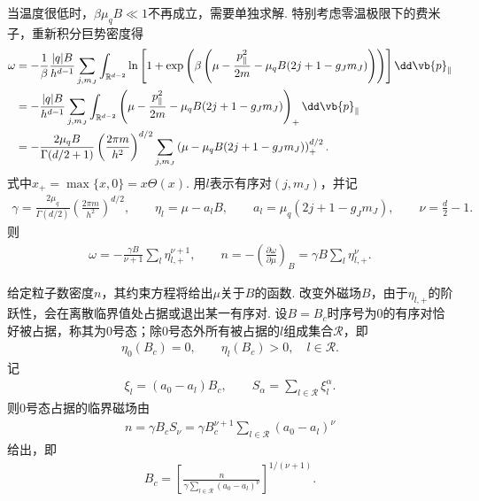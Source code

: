 当温度很低时，\(\beta\mu_{q}B\ll1\)不再成立，需要单独求解. 特别考虑零温极限下的费米子，重新积分巨势密度得
\begin{align*}
	\omega
	&=
	-\frac{1}{\beta}\frac{|q|B}{h^{d-1}}
	\sum_{j,m_{J}}
	\int_{\mathbb{R}^{d-2}}
	\ln\left[
		1+\exp\left(\beta\left(
		\mu-\frac{p_{\parallel}^{2}}{2m}
		-\mu_{q}B(2j+1-g_{J}m_{J})\right)
		\right)
		\right]\dd\vb{p}_{\parallel}\\
	&=
	-\frac{|q|B}{h^{d-1}}
	\sum_{j,m_{J}}
	\int_{\mathbb{R}^{d-2}}
	\left(
		\mu-\frac{p_{\parallel}^{2}}{2m}
		-\mu_{q}B(2j+1-g_{J}m_{J})
	\right)_{+}
	\dd\vb{p}_{\parallel}\\
	&=
	-\frac{2\mu_{q}B}{\Gamma(d/2+1)}
	\left(\frac{2\pi m}{h^{2}}\right)^{d/2}
	\sum_{j,m_{J}}
	\left(
		\mu-\mu_{q}B(2j+1-g_{J}m_{J})
	\right)_{+}^{d/2}.
\end{align*}
式中\(x_{+}=\max\{x,0\}=x\Theta(x)\). 用\(l\)表示有序对\((j,m_{J})\)，并记
\begin{align*}
	\gamma=
	\frac{2\mu_{q}}{\Gamma(d/2)}
	\left(\frac{2\pi m}{h^{2}}\right)^{d/2},
	\qquad
	\eta_{l}=\mu-a_{l}B,
	\qquad
	a_{l}=\mu_{q}(2j+1-g_{J}m_{J}),
	\qquad
	\nu=\frac{d}{2}-1 .
\end{align*}
则
\begin{align*}
	\omega
	=
	-\frac{\gamma B}{\nu+1}
	\sum_{l}\eta_{l,+}^{\nu+1},
	\qquad
	n
	=
	-\left(\frac{\partial\omega}{\partial\mu}\right)_{B}
	=
	\gamma B\sum_{l}\eta_{l,+}^{\nu}.
\end{align*}

给定粒子数密度\(n\)，其约束方程将给出\(\mu\)关于\(B\)的函数. 改变外磁场\(B\)，由于\(\eta_{l,+}\)的阶跃性，会在离散临界值处占据或退出某一有序对. 设\(B=B_{c}\)时序号为\(0\)的有序对恰好被占据，称其为\(0\)号态；除\(0\)号态外所有被占据的\(l\)组成集合\(\mathcal{R}\)，即
\begin{align*}
	\eta_{0}(B_{c})=0,
	\qquad
	\eta_{l}(B_{c})>0,\quad l\in\mathcal{R}.
\end{align*}
记
\begin{align*}
	\xi_{l}=(a_{0}-a_{l})B_{c},
	\qquad
	S_{\alpha}=\sum_{l\in\mathcal{R}}\xi_{l}^{\alpha}.
\end{align*}
则\(0\)号态占据的临界磁场由
\begin{align*}
	n
	=
	\gamma B_{c}S_{\nu}
	=
	\gamma B_{c}^{\nu+1}
	\sum_{l\in\mathcal{R}}(a_{0}-a_{l})^{\nu}
\end{align*}
给出，即
\begin{align*}
	B_{c}
	=
	\left[
		\frac{n}{\gamma\sum_{l\in\mathcal{R}}(a_{0}-a_{l})^{\nu}}
	\right]^{1/(\nu+1)}.
\end{align*}

